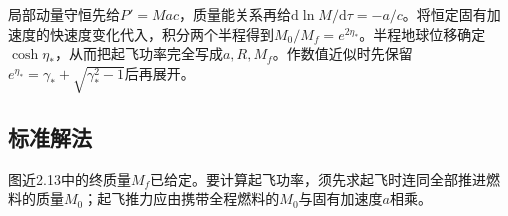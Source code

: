 \documentclass[UTF8,fontset=fandol,a4paper,11pt]{ctexart}
\begin{document}
局部动量守恒先给$P'=Mac$，质量能关系再给$\mathrm d\ln M/\mathrm d\tau=-a/c$。将恒定固有加速度的快速度变化代入，积分两个半程得到$M_0/M_f=e^{2\eta_*}$。半程地球位移确定$\cosh\eta_*$，从而把起飞功率完全写成$a,R,M_f$。作数值近似时先保留$e^{\eta_*}=\gamma_*+\sqrt{\gamma_*^2-1}$后再展开。



\subsection*{标准解法}


图近2.13中的终质量$M_f$已给定。要计算起飞功率，须先求起飞时连同全部推进燃料的质量$M_0$；起飞推力应由携带全程燃料的$M_0$与固有加速度$a$相乘。
\end{document}
